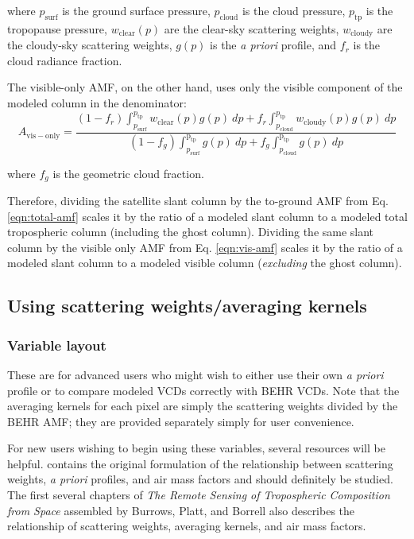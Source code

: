 \documentclass[12pt]{article}
\begin{document}
	where $p_{\mathrm{surf}}$ is the ground surface pressure, $p_{\mathrm{cloud}}$ is the cloud pressure, $p_{\mathrm{tp}}$ is the tropopause pressure, $w_{\mathrm{clear}}(p)$ are the clear-sky scattering weights, $w_{\mathrm{cloudy}}$ are the cloudy-sky scattering weights, $g(p)$ is the \emph{a priori}  profile, and $f_r$ is the cloud radiance fraction.	
	
	The visible-only AMF, on the other hand, uses only the visible component of the modeled column in the denominator:
	\begin{equation}\label{eqn:vis-amf}
	A_{\mathrm{vis-only}} = \frac{(1-f_r) \int_{p_{\mathrm{surf}}}^{p_{\mathrm{tp}}} w_{\mathrm{clear}}(p) g(p) \: dp + f_r \int_{p_{\mathrm{cloud}}}^{p_{\mathrm{tp}}} w_{\mathrm{cloudy}}(p) g(p) \: dp}%
{(1-f_g)\int_{p_{\mathrm{surf}}}^{\mathrm{p_{tp}}} g(p) \: dp + f_g \int_{p_{\mathrm{cloud}}}^{\mathrm{p_{tp}}} g(p) \: dp}
	\end{equation}
	
	where $f_g$ is the geometric cloud fraction. 
	
	Therefore, dividing the satellite slant column by the to-ground AMF from Eq. \eqref{eqn:total-amf} scales it by the ratio of a modeled slant column to a modeled total tropospheric column (including the ghost column). Dividing the same slant column by the visible only AMF from Eq. \eqref{eqn:vis-amf} scales it by the ratio of a modeled slant column to a modeled visible column (\emph{excluding} the ghost column).

	
	\subsection{Using scattering weights/averaging kernels} \label{sec:scweights}
	\subsubsection{Variable layout}
	These are for advanced users who might wish to either use their own \emph{a priori}  profile or to compare modeled  VCDs correctly with BEHR VCDs.  Note that the averaging kernels for each pixel are simply the scattering weights divided by the BEHR AMF; they are provided separately simply for user convenience.
	
	For new users wishing to begin using these variables, several resources will be helpful. \citet{palmer2001} contains the original formulation of the relationship between scattering weights, \emph{a priori}  profiles, and air mass factors and should definitely be studied. The first several chapters of \emph{The Remote Sensing of Tropospheric Composition from Space} assembled by Burrows, Platt, and Borrell \citep{burrows-platt} also describes the relationship of scattering weights, averaging kernels, and air mass factors.
	
\end{document}
